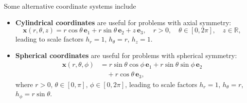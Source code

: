 \begin{definition}
Some alternative coordinate systems include
  
\begin{itemize}
    \item \textbf{Cylindrical coordinates} are useful for problems with axial symmetry:
    \[
    \boldsymbol{x}(r,\theta,z)
    = r\cos\theta\,\boldsymbol{e}_1
    + r\sin\theta\,\boldsymbol{e}_2
    + z\,\boldsymbol{e}_3,
    \quad r>0,\quad \theta\in[0,2\pi],\quad z\in\mathbb{R},
    \]
    leading to scale factors $h_r=1$, $h_\theta=r$, $h_z=1$.

    \item \textbf{Spherical coordinates} are useful for problems with spherical symmetry:
    \[
    \begin{aligned}
    \boldsymbol{x}(r,\theta,\phi)
    &= r\sin\theta\cos\phi\,\boldsymbol{e}_1
    + r\sin\theta\sin\phi\,\boldsymbol{e}_2 \\
    &\quad + r\cos\theta\,\boldsymbol{e}_3,
    \end{aligned}
    \]
    where $r>0$, $\theta\in[0,\pi]$, $\phi\in[0,2\pi]$,
    leading to scale factors $h_r=1$, $h_\theta=r$, $h_\phi=r\sin\theta$.
\end{itemize}  
\end{definition}

